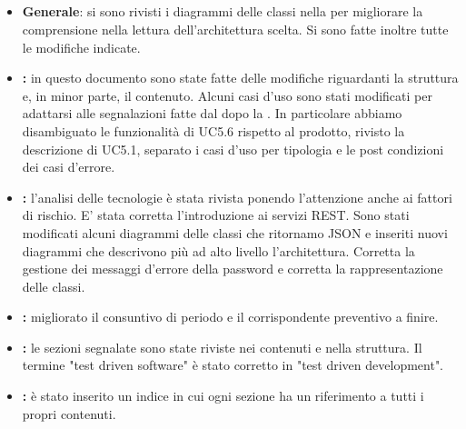 \documentclass[12pt,a4paper]{article}
\begin{document}
	\subsection{\RP{}}
	\begin{itemize}
		\item \textbf{Generale}: si sono rivisti i diagrammi delle classi nella \DP{}  per migliorare la comprensione nella lettura dell'architettura scelta. Si sono fatte inoltre tutte le modifiche indicate.
		\item \textbf{\AdR{}:} in questo documento sono state fatte delle modifiche  riguardanti la struttura e, in minor parte, il contenuto. Alcuni casi d'uso sono stati modificati per adattarsi  alle segnalazioni fatte dal  dopo la \RP. In particolare abbiamo disambiguato le funzionalità di UC5.6 rispetto al prodotto, rivisto la descrizione di UC5.1, separato i casi d'uso per tipologia e le post condizioni dei casi d'errore.
		\item \textbf{\DP{}:} l'analisi delle tecnologie è stata rivista ponendo l'attenzione anche ai fattori di rischio. E' stata corretta l'introduzione ai servizi REST. Sono stati modificati alcuni diagrammi delle classi che ritornamo JSON e inseriti nuovi diagrammi che descrivono più ad alto livello l'architettura. Corretta la gestione dei messaggi d'errore della password e corretta la rappresentazione delle classi.
	    \item \textbf{\PdP{}:} migliorato il consuntivo di periodo e il corrispondente preventivo a finire.
	    \item \textbf{\PdQ{}:} le sezioni segnalate sono state riviste nei contenuti e nella struttura. Il termine "test driven software" è stato corretto in "test driven development".
	    \item \textbf{\GL{}:} è stato inserito un indice in cui ogni sezione ha un riferimento a tutti i propri contenuti.
	\end{itemize}
	

	
\end{document}
